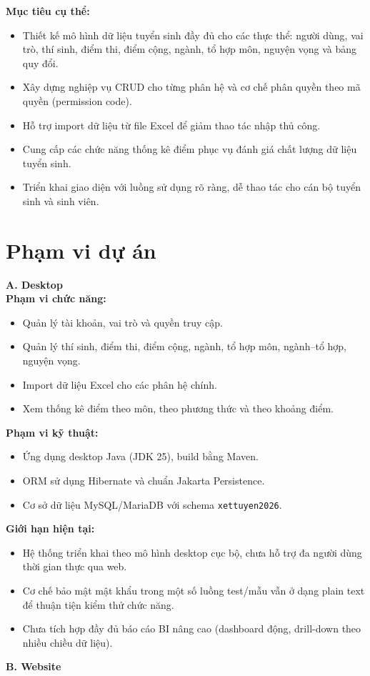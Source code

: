 \documentclass[12pt,a4paper,oneside]{report}
\begin{document}
\textbf{Mục tiêu cụ thể:}
\begin{itemize}
  \item Thiết kế mô hình dữ liệu tuyển sinh đầy đủ cho các thực thể: người dùng, vai trò, thí sinh, điểm thi, điểm cộng, ngành, tổ hợp môn, nguyện vọng và bảng quy đổi.
  \item Xây dựng nghiệp vụ CRUD cho từng phân hệ và cơ chế phân quyền theo mã quyền (permission code).
  \item Hỗ trợ import dữ liệu từ file Excel để giảm thao tác nhập thủ công.
  \item Cung cấp các chức năng thống kê điểm phục vụ đánh giá chất lượng dữ liệu tuyển sinh.
  \item Triển khai giao diện với luồng sử dụng rõ ràng, dễ thao tác cho cán bộ tuyển sinh và sinh viên.
\end{itemize}

\section{Phạm vi dự án}
\textbf{A. Desktop\\}
\textbf{Phạm vi chức năng:}
\begin{itemize}
  \item Quản lý tài khoản, vai trò và quyền truy cập.
  \item Quản lý thí sinh, điểm thi, điểm cộng, ngành, tổ hợp môn, ngành--tổ hợp, nguyện vọng.
  \item Import dữ liệu Excel cho các phân hệ chính.
  \item Xem thống kê điểm theo môn, theo phương thức và theo khoảng điểm.
\end{itemize}

\textbf{Phạm vi kỹ thuật:}
\begin{itemize}
  \item Ứng dụng desktop Java (JDK 25), build bằng Maven.
  \item ORM sử dụng Hibernate và chuẩn Jakarta Persistence.
  \item Cơ sở dữ liệu MySQL/MariaDB với schema \texttt{xettuyen2026}.
\end{itemize}

\textbf{Giới hạn hiện tại:}
\begin{itemize}
  \item Hệ thống triển khai theo mô hình desktop cục bộ, chưa hỗ trợ đa người dùng thời gian thực qua web.
  \item Cơ chế bảo mật mật khẩu trong một số luồng test/mẫu vẫn ở dạng plain text để thuận tiện kiểm thử chức năng.
  \item Chưa tích hợp đầy đủ báo cáo BI nâng cao (dashboard động, drill-down theo nhiều chiều dữ liệu).
\end{itemize}
\textbf{B. Website\\}
\end{document}
